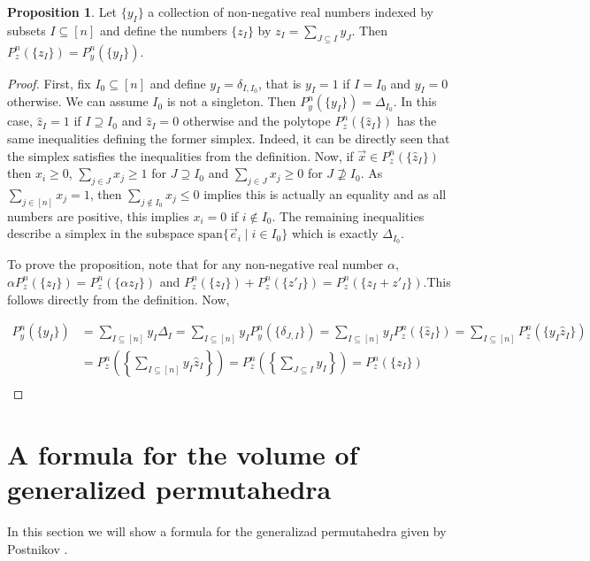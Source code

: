 \documentclass[english,11pt]{article}
\theoremstyle{definition}
\theoremstyle{definition}
\newtheorem{proposition}{Proposition}[section]
\theoremstyle{definition}
\theoremstyle{remark}
\theoremstyle{definition}
\begin{document}
\begin{proposition}
Let $\{ y_I\}$ a collection of non-negative real numbers indexed by subsets $I \subseteq [n]$ and define the numbers $\{z_I\}$ by $z_I = \sum_{J\subseteq I}y_J$. Then $P_z^n(\{z_I\}) = P_y^n(\{y_I\})$.

\begin{proof}
First, fix $I_0 \subseteq [n]$ and define $y_I = \delta_{I,I_0}$, that is $y_I = 1$ if $I=I_0$ and $y_I = 0$ otherwise. We can assume $I_0$ is not a singleton. Then $P_y^n(\{y_I\}) = \Delta_{I_0}$. In this case, $\hat z_I = 1$ if $I\supseteq I_0$ and $\hat z_I=0$ otherwise and the polytope $P_z^n(\{\hat z_I\})$ has the same inequalities defining the former simplex. Indeed, it can be directly seen that the simplex satisfies the inequalities from the definition. Now, if $\Vec{x}\in P_z^n(\{\hat z_I\})$ then $x_i \geq 0$, $\sum_{j\in J}x_j \geq 1$ for $J\supseteq I_0$ and $\sum_{j\in J}x_j \geq 0$ for $J\not\supseteq I_0$. As $\sum_{j\in [n]}x_j =1$, then $\sum_{j\not\in I_0} x_j \leq 0$ implies this is actually an equality and as all numbers are positive, this implies $x_i=0$ if $i\not\in I_0$. The remaining inequalities describe a simplex in the subspace $\text{span}\{\Vec{e}_i  \mid i\in I_0\}$ which is exactly $\Delta_{I_0}$. 

To prove the proposition, note that for any non-negative real number $\alpha$, $\alpha P_z^n(\{z_I\}) = P_z^n(\{\alpha z_I\})$ and $P_z^n(\{z_I\}) + P_z^n(\{z'_I\}) = P_z^n(\{z_I+z'_I\})$.This follows directly from the definition. Now, 

\begin{align*}
    P_y^n(\{y_I\}) &= \sum_{I\subseteq [n]}y_I\Delta_I = \sum_{I\subseteq [n]}y_I P_y^n(\{\delta_{J,I}\}) =\sum_{I\subseteq [n]}y_I P_z^n(\{\hat z_I\}) = \sum_{I\subseteq [n]} P_z^n(\{y_I \hat z_I\}) \\ 
    &= P_z^n\left(\left\{\sum_{I\subseteq [n]} y_I \hat z_I\right\}\right) = P_z^n\left(\left\{\sum_{J\subseteq I} y_I\right\}\right) = P_z^n(\{z_I\}) \\
\end{align*}
\end{proof}
\label{prop2.1}
\end{proposition}

\section{A formula for the volume of generalized permutahedra}
In this section we will show a formula for the generalizad permutahedra given by Postnikov \cite{Postnikov-PAB}. 
\end{document}
